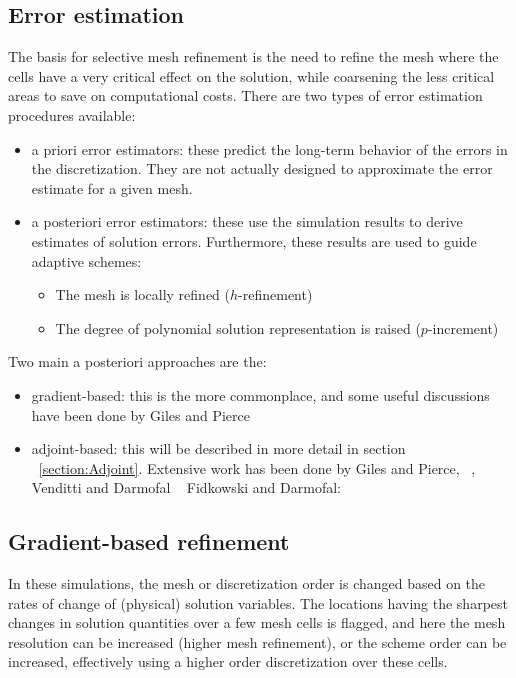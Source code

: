 \subsection{Error estimation}
The basis for selective mesh refinement is the need to refine the mesh where the cells have a very critical effect on the solution, while coarsening the less critical areas to save on computational costs. There are two types of error estimation procedures available:
\begin{itemize}
\item a priori error estimators: these predict the long-term behavior of the errors in the discretization. They are not actually designed to approximate the error estimate for a given mesh. 
\item a posteriori error estimators: these use the simulation results to derive estimates of solution errors. Furthermore, these results are used to guide adaptive schemes:
\begin{itemize}
\item The mesh is locally refined ($h$-refinement) 
\item The degree of polynomial solution representation is raised ($p$-increment)
\end{itemize}
\end{itemize}
Two main a posteriori approaches are the:
\begin{itemize}
\item gradient-based: this is the more commonplace, and some useful discussions have been done by Giles and Pierce ~\cite{Giles:2000}
\item adjoint-based: this will be described in more detail in section ~\ref{section:Adjoint}. Extensive work has been done by Giles and Pierce, ~\cite{Giles:2000}, Venditti and Darmofal ~\cite{Venditti:2000, Venditti:2002, Venditti:2003} Fidkowski and Darmofal: ~\cite{Fidkowski:2011} 
\end{itemize}


\subsection{Gradient-based refinement}

In these simulations, the mesh or discretization order is changed based on the rates of change of (physical) solution variables. The locations having the sharpest changes in solution quantities over a few mesh cells is flagged, and here the mesh resolution can be increased (higher mesh refinement), or the scheme order can be increased, effectively using a higher order discretization over these cells.

